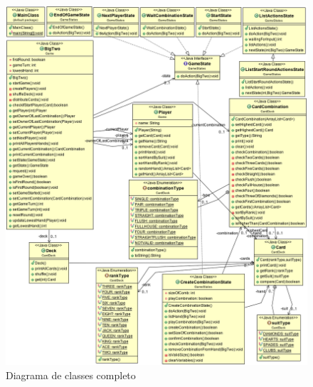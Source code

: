 \documentclass[12pt]{article}
\begin{document}



\begin{figure}[h!]
	\centering
	\includegraphics[width=.8\textwidth]{umlfull.png}
	\caption{Diagrama de classes completo}
	\label{umlfull}
\end{figure}
\end{document}
